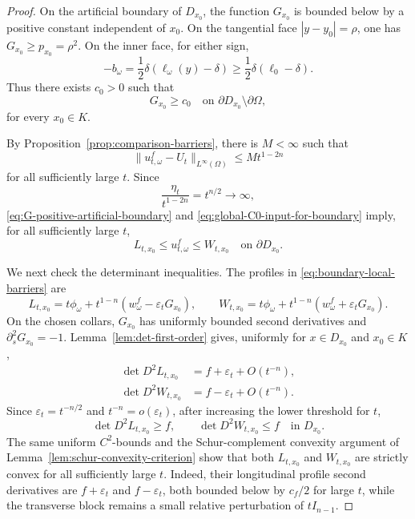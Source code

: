 \documentclass[10pt,a4paper]{amsart}
\begin{document}
\begin{proof}
On the artificial boundary of \(D_{x_0}\), the function \(G_{x_0}\) is bounded below by a positive constant independent of \(x_0\).  On the tangential face \(|y-y_0|=\rho\), one has \(G_{x_0}\ge p_{x_0}=\rho^2\).  On the inner face, for either sign,
\[
    -b_\omega=\frac12\delta(\ell_\omega(y)-\delta)
    \ge \frac12\delta(\ell_0-\delta).
\]
Thus there exists \(c_0>0\) such that
\begin{equation}\label{eq:G-positive-artificial-boundary}
    G_{x_0}\ge c_0
    \quad\text{on }\partial D_{x_0}\setminus\partial\Omega,
\end{equation}
for every \(x_0\in K\).

By Proposition~\ref{prop:comparison-barriers}, there is \(M<\infty\) such that
\begin{equation}\label{eq:global-C0-input-for-boundary}
    \|u_{t,\omega}^f-U_t\|_{L^\infty(\Omega)}\le M t^{1-2n}
\end{equation}
for all sufficiently large \(t\).  Since
\[
    \frac{\eta_t}{t^{1-2n}}=t^{n/2}\to\infty,
\]
\eqref{eq:G-positive-artificial-boundary} and \eqref{eq:global-C0-input-for-boundary} imply, for all sufficiently large \(t\),
\[
    L_{t,x_0}\le u_{t,\omega}^f\le W_{t,x_0}
    \quad\text{on }\partial D_{x_0}.
\]

We next check the determinant inequalities.  The profiles in \eqref{eq:boundary-local-barriers} are
\[
    L_{t,x_0}
    =
    t\phi_\omega+t^{1-n}(w_\omega^f-\varepsilon_tG_{x_0}),
    \qquad
    W_{t,x_0}
    =
    t\phi_\omega+t^{1-n}(w_\omega^f+\varepsilon_tG_{x_0}).
\]
On the chosen collars, \(G_{x_0}\) has uniformly bounded second derivatives and \(\partial_s^2G_{x_0}=-1\).  Lemma~\ref{lem:det-first-order} gives, uniformly for \(x\in D_{x_0}\) and \(x_0\in K\),
\begin{equation}\label{eq:boundary-barrier-det-expansion}
\begin{aligned}
    \det D^2L_{t,x_0}&=f+\varepsilon_t+O(t^{-n}),\\
    \det D^2W_{t,x_0}&=f-\varepsilon_t+O(t^{-n}).
\end{aligned}
\end{equation}
Since \(\varepsilon_t=t^{-n/2}\) and \(t^{-n}=o(\varepsilon_t)\), after increasing the lower threshold for \(t\),
\begin{equation}\label{eq:boundary-barrier-det-inequalities}
    \det D^2L_{t,x_0}\ge f,
    \qquad
    \det D^2W_{t,x_0}\le f
    \quad\text{in }D_{x_0}.
\end{equation}
The same uniform \(C^2\)-bounds and the Schur-complement convexity argument of Lemma~\ref{lem:schur-convexity-criterion} show that both \(L_{t,x_0}\) and \(W_{t,x_0}\) are strictly convex for all sufficiently large \(t\).  Indeed, their longitudinal profile second derivatives are \(f+\varepsilon_t\) and \(f-\varepsilon_t\), both bounded below by \(c_f/2\) for large \(t\), while the transverse block remains a small relative perturbation of \(tI_{n-1}\).


\end{proof}
\end{document}
